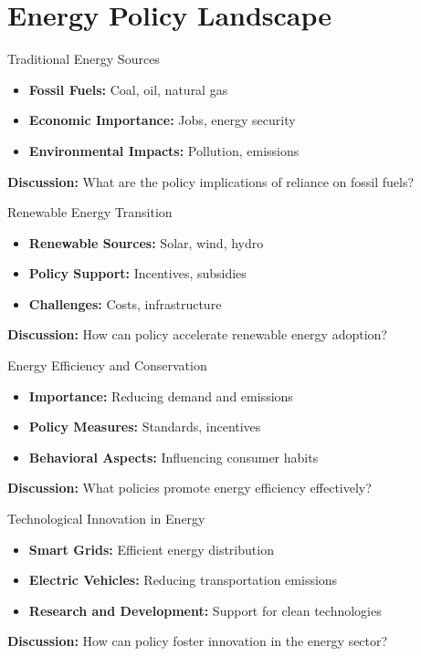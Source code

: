 \documentclass[11pt, aspectratio=169]{beamer}
\begin{document}
\section{Energy Policy Landscape}

\begin{frame}{Traditional Energy Sources}
    \begin{itemize}
        \item \textbf{Fossil Fuels:} Coal, oil, natural gas
        \item \textbf{Economic Importance:} Jobs, energy security
        \item \textbf{Environmental Impacts:} Pollution, emissions
    \end{itemize}
    \pause
    \textbf{Discussion:} What are the policy implications of reliance on fossil fuels?
\end{frame}

\begin{frame}{Renewable Energy Transition}
    \begin{itemize}
        \item \textbf{Renewable Sources:} Solar, wind, hydro
        \item \textbf{Policy Support:} Incentives, subsidies
        \item \textbf{Challenges:} Costs, infrastructure
    \end{itemize}
    \pause
    \textbf{Discussion:} How can policy accelerate renewable energy adoption?
\end{frame}

\begin{frame}{Energy Efficiency and Conservation}
    \begin{itemize}
        \item \textbf{Importance:} Reducing demand and emissions
        \item \textbf{Policy Measures:} Standards, incentives
        \item \textbf{Behavioral Aspects:} Influencing consumer habits
    \end{itemize}
    \pause
    \textbf{Discussion:} What policies promote energy efficiency effectively?
\end{frame}

\begin{frame}{Technological Innovation in Energy}
    \begin{itemize}
        \item \textbf{Smart Grids:} Efficient energy distribution
        \item \textbf{Electric Vehicles:} Reducing transportation emissions
        \item \textbf{Research and Development:} Support for clean technologies
    \end{itemize}
    \pause
    \textbf{Discussion:} How can policy foster innovation in the energy sector?
\end{frame}
\end{document}
